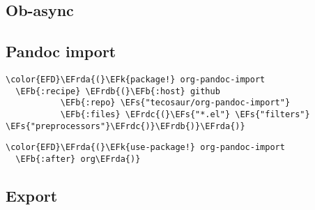\documentclass[12pt]{article}
\theoremstyle{plain}%
\theoremstyle{definition}
\theoremstyle{remark}
\newcommand{\EFs}[1]{\textcolor{EFs}{#1}} %
\newcommand{\EFk}[1]{\textcolor{EFk}{#1}} %
\newcommand{\EFb}[1]{\textcolor{EFb}{#1}} %
\newcommand{\EFrda}[1]{\textcolor{EFrda}{#1}} %
\newcommand{\EFrdb}[1]{\textcolor{EFrdb}{#1}} %
\newcommand{\EFrdc}[1]{\textcolor{EFrdc}{#1}} %
\begin{document}
\subsection{Ob-async}
\label{sec:orgf9eaa01}
\subsection{Pandoc import}
\label{sec:orgf3966bb}
\begin{Code}
\begin{Verbatim}
\color{EFD}\EFrda{(}\EFk{package!} org-pandoc-import
  \EFb{:recipe} \EFrdb{(}\EFb{:host} github
           \EFb{:repo} \EFs{"tecosaur/org-pandoc-import"}
           \EFb{:files} \EFrdc{(}\EFs{"*.el"} \EFs{"filters"} \EFs{"preprocessors"}\EFrdc{)}\EFrdb{)}\EFrda{)}
\end{Verbatim}
\end{Code}
\begin{Code}
\begin{Verbatim}
\color{EFD}\EFrda{(}\EFk{use-package!} org-pandoc-import
  \EFb{:after} org\EFrda{)}
\end{Verbatim}
\end{Code}
\subsection{Export}
\label{sec:orgb30a032}
\end{document}

